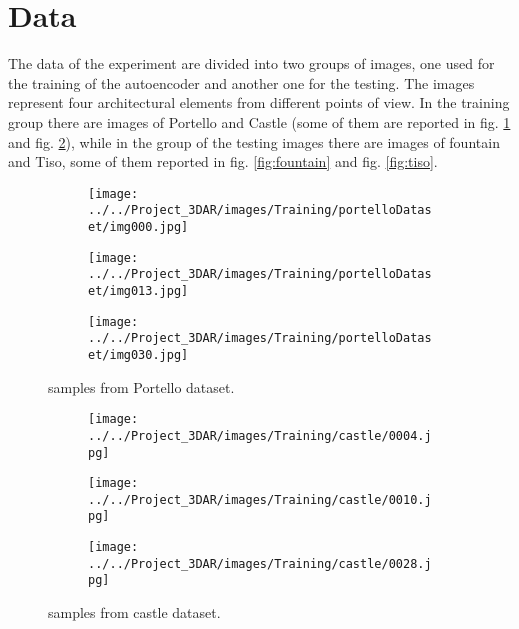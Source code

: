 
\section{Data}
The data of the experiment are divided into two groups of images, one used for the training of the autoencoder and another one for the testing. The images represent four architectural elements from different points of view. In the training group there are images of Portello and Castle (some of them are reported in fig. \ref{fig:portello} and fig. \ref{fig:castle}), while in the group of the testing images there are images of fountain and Tiso, some of them reported in fig. \ref{fig:fountain} and fig. \ref{fig:tiso}.

\begin{figure}[H]
     \centering
     \begin{subfigure}[b]{0.3\textwidth}
         \centering
         \texttt{[image: ../../Project\_3DAR/images/Training/portelloDataset/img000.jpg]}
     \end{subfigure}
     \hfill
     \begin{subfigure}[b]{0.3\textwidth}
         \centering
         \texttt{[image: ../../Project\_3DAR/images/Training/portelloDataset/img013.jpg]}
     \end{subfigure}
     \hfill
     \begin{subfigure}[b]{0.3\textwidth}
         \centering
         \texttt{[image: ../../Project\_3DAR/images/Training/portelloDataset/img030.jpg]}
     \end{subfigure}
        \caption{samples from Portello dataset.}
        \label{fig:portello}
\end{figure}

\begin{figure}[H]
     \centering
     \begin{subfigure}[b]{0.3\textwidth}
         \centering
         \texttt{[image: ../../Project\_3DAR/images/Training/castle/0004.jpg]}
     \end{subfigure}
     \hfill
     \begin{subfigure}[b]{0.3\textwidth}
         \centering
         \texttt{[image: ../../Project\_3DAR/images/Training/castle/0010.jpg]}
     \end{subfigure}
     \hfill
     \begin{subfigure}[b]{0.3\textwidth}
         \centering
         \texttt{[image: ../../Project\_3DAR/images/Training/castle/0028.jpg]}
     \end{subfigure}
        \caption{samples from castle dataset.}
        \label{fig:castle}
\end{figure}

